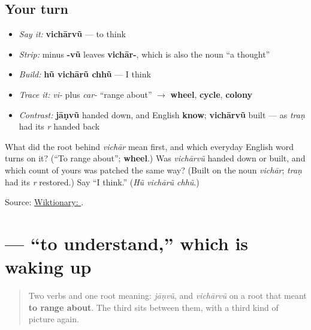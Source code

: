 \subsection*{Your turn}
\begin{itemize}
\raggedright
  \item \emph{Say it:} \textbf{vichārvũ} — to think
  \item \emph{Strip:} minus \textbf{-vũ} leaves \textbf{vichār-}, which is also the noun \textquotedblleft{}a thought\textquotedblright{}
  \item \emph{Build:} \textbf{hũ vichārũ chhũ} — I think
  \item \emph{Trace it:} \emph{vi-} plus \emph{car-} \textquotedblleft{}range about\textquotedblright{} $\to$ \textbf{wheel}, \textbf{cycle}, \textbf{colony}
  \item \emph{Contrast:} \textbf{jāṇvũ} handed down, and English \textbf{know}; \textbf{vichārvũ} built — as \emph{traṇ} had its \emph{r} handed back
\end{itemize}

\begin{tcolorbox}[breakable,colback=teal!4,colframe=teal!35!black,title={Before you move on}]
What did the root behind \emph{vichār} mean first, and which everyday English word turns on it? (\textquotedblleft{}To range about\textquotedblright{}; \textbf{wheel}.) Was \emph{vichārvũ} handed down or built, and which count of yours was patched the same way? (Built on the noun \emph{vichār}; \emph{traṇ} had its \emph{r} restored.) Say \textquotedblleft{}I think.\textquotedblright{} (\emph{Hũ vichārũ chhũ}.)

Source: \href{https://en.wiktionary.org/wiki/\%E0\%AA\%B5\%E0\%AA\%BF\%E0\%AA\%9A\%E0\%AA\%BE\%E0\%AA\%B0\%E0\%AA\%B5\%E0\%AB\%81\%E0\%AA\%82}{Wiktionary: }.
\end{tcolorbox}
\section[samajvũ]{ — \textquotedblleft{}to understand,\textquotedblright{} which is waking up}

\label{lesson:GU-C08-samajvun}



\begin{quote}
Two verbs and one root meaning: \emph{jāṇvũ}, and \emph{vichārvũ} on a root that meant \textbf{to range about}. The third sits between them, with a third kind of picture again.
\end{quote}

